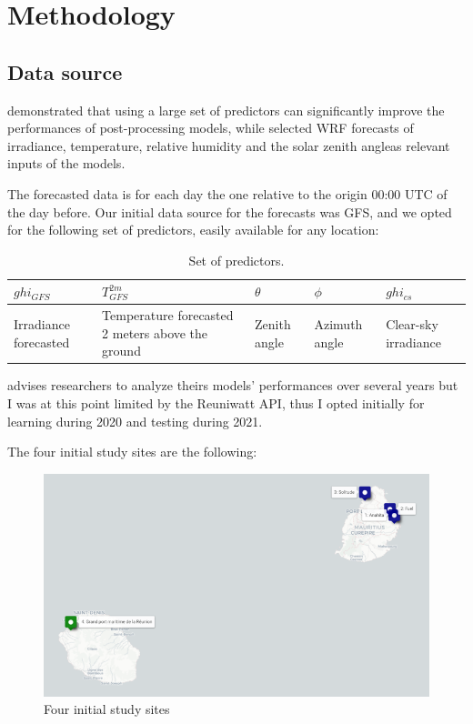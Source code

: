 \section{Methodology}
\subsection{Data source}
\cite{verbois_statistical_2022} demonstrated that using a large set of predictors can significantly improve the performances of post-processing models, while \cite{suksamosorn_post-processing_2021}
selected WRF forecasts of irradiance, temperature, relative humidity and the solar zenith angleas relevant inputs of the models.

The forecasted data is for each day the one relative to the origin 00:00 UTC of the day before.
Our initial data source for the forecasts was GFS, and we opted for the following set of predictors, easily available for any location:

\begin{table}[h]
    \centering
    \begin{tabularx}{\textwidth} { 
  | >{\centering\arraybackslash}X 
  | >{\centering\arraybackslash}X 
  | >{\centering\arraybackslash}X 
  | >{\centering\arraybackslash}X
  | >{\centering\arraybackslash}X 
  |}
 \hline
 $ghi_{GFS}$ & $T_{GFS}^{2m}$ & $\theta$ & $\phi$ & $ghi_{cs}$ \\
 \hline
 \scriptsize Irradiance forecasted  & \scriptsize Temperature forecasted 2 meters above the ground & \scriptsize Zenith angle & \scriptsize Azimuth angle & \scriptsize Clear-sky irradiance \\
\hline
\end{tabularx}
    \caption{Set of predictors.}
    \label{tab:set_pred}
\end{table}

\cite{verbois_statistical_2022} advises researchers to analyze theirs models' performances over several years but I was at this point limited by the Reuniwatt API, thus
I opted initially for learning during 2020 and testing during 2021.

The four initial study sites are the following:
\begin{figure}[htb!]
    \centering
    \includegraphics[width=\textwidth]{figures/initial_study_sites.png}
    \caption{Four initial study sites}
\end{figure}
